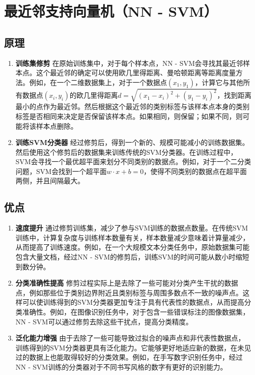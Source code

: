 \documentclass[12pt]{article}
\begin{document}
\section{最近邻支持向量机（NN - SVM）}
\subsection{原理}
\begin{enumerate}
    \item \textbf{训练集修剪}
    在原始训练集中，对于每个样本点，NN - SVM会寻找其最近邻样本点。这个最近邻的确定可以使用欧几里得距离、曼哈顿距离等距离度量方法。例如，在一个二维数据集上，对于一个数据点\((x_1,y_1)\)，计算它与其他所有数据点\((x_i,y_i)\)的欧几里得距离\(d = \sqrt{(x_1 - x_i)^2+(y_1 - y_i)^2}\)，找到距离最小的点作为最近邻。然后根据这个最近邻的类别标签与该样本点本身的类别标签是否相同来决定是否保留该样本点。如果相同，则保留；如果不同，则可能将该样本点删除。
    \item \textbf{训练SVM分类器}
    经过修剪后，得到一个新的、规模可能减小的训练数据集。然后使用这个修剪后的数据集来训练传统的SVM分类器。在训练过程中，SVM会寻找一个最优超平面来划分不同类别的数据点。例如，对于一个二分类问题，SVM会找到一个超平面\(w\cdot x + b = 0\)，使得不同类别的数据点在超平面两侧，并且间隔最大。
\end{enumerate}

\subsection{优点}
\begin{enumerate}
    \item \textbf{速度提升}
    通过修剪训练集，减少了参与SVM训练的数据点数量。在传统SVM训练中，计算复杂度与训练样本数量有关，样本数量减少意味着计算量减少，从而提高了训练速度。例如，在一个大规模文本分类任务中，原始数据集可能包含大量文档，经过NN - SVM的修剪后，训练SVM的时间可能从数小时缩短到数分钟。
    \item \textbf{分类准确性提高}
    修剪过程实际上是去除了一些可能对分类产生干扰的数据点，例如那些位于类别边界附近且类别标签与周围多数点不一致的噪声点。这样可以使训练得到的SVM分类器更加专注于具有代表性的数据点，从而提高分类准确性。例如，在图像识别任务中，对于包含一些错误标注的图像数据集，NN - SVM可以通过修剪去除这些干扰点，提高分类精度。
    \item \textbf{泛化能力增强}
    由于去除了一些可能导致过拟合的噪声点和非代表性数据点，训练得到的SVM分类器更具有泛化能力。它能够更好地适应新的数据，在未见过的数据上也能取得较好的分类效果。例如，在手写数字识别任务中，经过NN - SVM训练的分类器对于不同书写风格的数字有更好的识别能力。
\end{enumerate}
\end{document}
